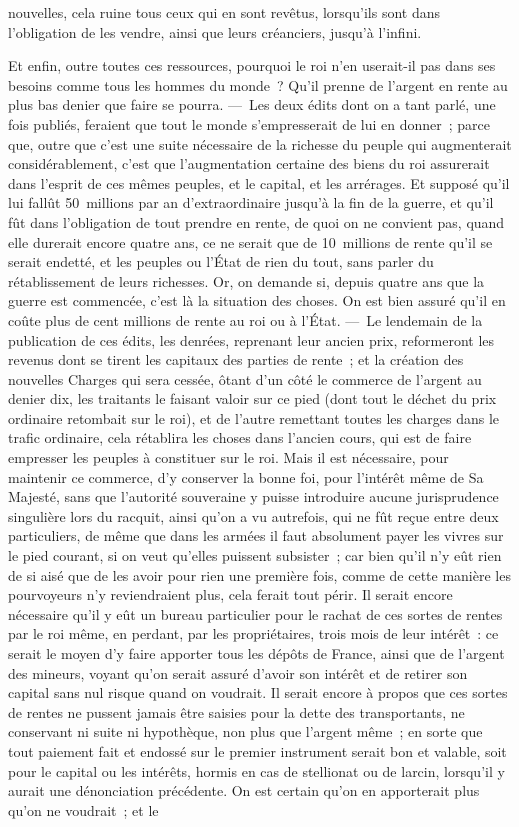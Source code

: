 \documentclass[french,twoside]{book} %
\begin{document}
nouvelles, cela ruine tous ceux qui en sont revêtus, lorsqu’ils sont dans l’obligation de les vendre, ainsi que leurs créanciers, jusqu’à l’infini.\par
Et enfin, outre toutes ces ressources, pourquoi le roi n’en userait-il pas dans ses besoins comme tous les hommes du monde ? Qu’il prenne de l’argent en rente au plus bas denier que faire se pourra. — Les deux édits dont on a tant parlé, une fois publiés, feraient que tout le monde s’empresserait de lui en donner ; parce que, outre que c’est une suite nécessaire de la richesse du peuple qui augmenterait considérablement, c’est que l’augmentation certaine des biens du roi assurerait dans l’esprit de ces mêmes peuples, et le capital, et les arrérages. Et supposé qu’il lui fallût 50 millions par an d’extraordinaire jusqu’à la fin de la guerre, et qu’il fût dans l’obligation de tout prendre en rente, de quoi on ne convient pas, quand elle durerait encore quatre ans, ce ne serait que de 10 millions de rente qu’il se serait endetté, et les peuples ou l’État de rien du tout, sans parler du rétablissement de leurs richesses. Or, on demande si, depuis quatre ans que la guerre est commencée, c’est là la situation des choses. On est bien assuré qu’il en coûte plus de cent millions de rente au roi ou à l’État. — Le lendemain de la publication de ces édits, les denrées, reprenant leur ancien prix, reformeront les revenus dont se tirent les capitaux des parties de rente ; et la création des nouvelles Charges qui sera cessée, ôtant d’un côté le commerce de l’argent au denier dix, les traitants le faisant valoir sur ce pied (dont tout le déchet du prix ordinaire retombait sur le roi), et de l’autre remettant toutes les charges dans le trafic ordinaire, cela rétablira les choses dans l’ancien cours, qui est de faire empresser les peuples à constituer sur le roi. Mais il est nécessaire, pour maintenir ce commerce, d’y conserver la bonne foi, pour l’intérêt même de Sa Majesté, sans que l’autorité souveraine y puisse introduire aucune jurisprudence singulière lors du racquit, ainsi qu’on a vu autrefois, qui ne fût reçue entre deux particuliers, de même que dans les armées il faut absolument payer les vivres sur le pied courant, si on veut qu’elles puissent subsister ; car bien qu’il n’y eût rien de si aisé que de les avoir pour rien une première fois, comme de cette manière les pourvoyeurs n’y reviendraient plus, cela ferait tout périr. Il serait encore nécessaire qu’il y eût un bureau particulier pour le rachat de ces sortes de rentes par le roi même, en perdant, par les propriétaires, trois mois de leur intérêt : ce serait le moyen d’y faire apporter tous les dépôts de France, ainsi que de l’argent des mineurs, voyant qu’on serait assuré d’avoir son intérêt et de retirer son capital sans nul risque quand on voudrait. Il serait encore à propos que ces sortes de rentes ne pussent jamais être saisies pour la dette des transportants, ne conservant ni suite ni hypothèque, non plus que l’argent même ; en sorte que tout paiement fait et endossé sur le premier instrument serait bon et valable, soit pour le capital ou les intérêts, hormis en cas de stellionat ou de larcin, lorsqu’il y aurait une dénonciation précédente. On est certain qu’on en apporterait plus qu’on ne voudrait ; et le 
\end{document}
